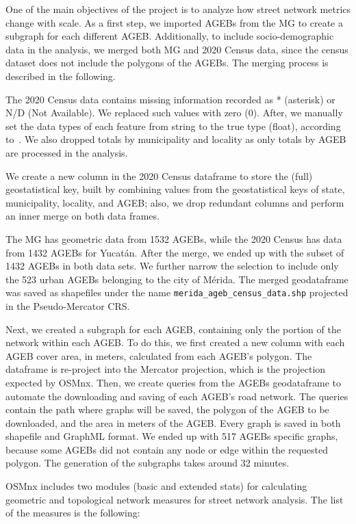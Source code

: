 One of the main objectives of the project is to analyze how street network metrics change with scale. As a first step, we imported AGEBs from the MG to create a subgraph for each different AGEB. Additionally, to include socio-demographic data in the analysis, we merged both MG and 2020 Census data, since the census dataset does not include the polygons of the AGEBs. The merging process is described in the following.

The 2020 Census data contains missing information recorded as * (asterisk) or N/D (Not Available). We replaced such values with zero (0). After,  we manually set the data types of each feature from string to the true type (float), according to~\cite{census_data}. We also dropped totals by municipality and locality as only totals by AGEB are processed in the analysis.

We create a new column in the 2020 Census dataframe to store the (full) geostatistical key, built by combining values from the geostatistical keys of state, municipality, locality, and AGEB; also, we drop redundant columns and perform an inner merge \cite{pandas_merge} on both data frames.

The MG has geometric data from 1532 AGEBs, while the 2020 Census has data from 1432 AGEBs for Yucatán. After the merge, we ended up with the subset of 1432 AGEBs in both data sets. We further narrow the selection to include only the 523 urban AGEBs belonging to the city of Mérida. The merged geodataframe was saved as shapefiles under the name \verb|merida_ageb_census_data.shp| projected in the Pseudo-Mercator CRS.

Next, we created a subgraph for each AGEB, containing only the portion of the network within each AGEB. To do this, we first created a new column with each AGEB cover area, in meters, calculated from each AGEB's polygon. The dataframe is re-project into the Mercator projection, which is the projection expected by OSMnx. Then, we create queries from the AGEBs geodataframe to automate the downloading and saving of each AGEB's road network. The queries contain the path where graphs will be saved, the polygon of the AGEB to be downloaded, and the area in meters of the AGEB. Every graph is saved in both shapefile and GraphML format. We ended up with 517 AGEBs specific graphs, because some AGEBs did not contain any node or edge within the requested polygon. The generation of the subgraphs takes around 32 minutes.

OSMnx includes two modules (basic and extended stats) for calculating geometric and topological network measures for street network analysis. The list of the measures is the following:

